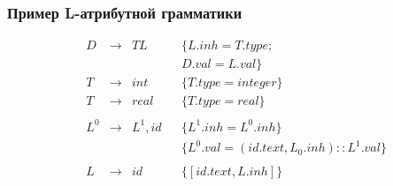 \documentclass{beamer}
\begin{document}
\begin{frame}[fragile]
  \transwipe[direction=90]
  \frametitle{Пример L-атрибутной грамматики}
$$
\begin{array}{ccclll}
&D  & \rightarrow & TL      &                                &\{L.inh = T.type;\\
&   &             &         &                                &  D.val = L.val\} \\
&T  & \rightarrow & int     &                                &\{T.type = integer\}\\
&T  & \rightarrow & real    &                                &\{T.type = real\}\\~\\

&L^0& \rightarrow & L^1, id &                                &\{L^1.inh = L^0.inh\}\\
&   &             &         &                                &\{L^0.val = (id.text, L_0.inh) :: L^1.val\}\\~\\

& L & \rightarrow &  id     &                                &\{[id.text, L.inh]\}\\
\end{array}
$$
\end{frame}
\end{document}
